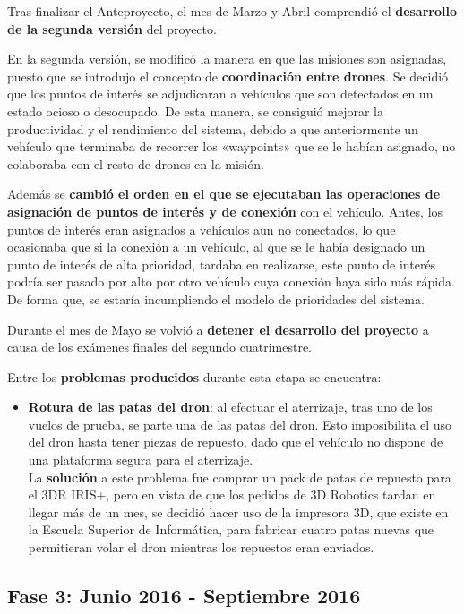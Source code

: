 Tras finalizar el Anteproyecto, el mes de Marzo y Abril comprendió el \textbf{desarrollo de la segunda versión} del proyecto.

En la segunda versión, se modificó la manera en que las misiones son asignadas, puesto que se introdujo el concepto de \textbf{coordinación entre drones}. Se decidió que los puntos de interés se adjudicaran a vehículos que son detectados en un estado ocioso o desocupado. De esta manera, se consiguió mejorar la productividad y el rendimiento del sistema, debido a que anteriormente un vehículo que terminaba de recorrer los «waypoints» que se le habían asignado, no colaboraba con el resto de drones en la misión. 

Además se \textbf{cambió el orden en el que se ejecutaban las operaciones de asignación de puntos de interés y de conexión} con el vehículo. Antes, los puntos de interés eran asignados a vehículos aun no conectados, lo que ocasionaba que si la conexión a un vehículo, al que se le había designado un punto de interés de alta prioridad, tardaba en realizarse, este punto de interés podría ser pasado por alto por otro vehículo cuya conexión haya sido más rápida. De forma que, se estaría incumpliendo el modelo de prioridades del sistema.

Durante el mes de Mayo se volvió a \textbf{detener el desarrollo del proyecto} a causa de los exámenes finales del segundo cuatrimestre.

Entre los \textbf{problemas producidos} durante esta etapa se encuentra:
\begin{itemize}
\item \textbf{Rotura de las patas del dron}: al efectuar el aterrizaje, tras uno de los vuelos de prueba, se parte una de las patas del dron. Esto imposibilita el uso del dron hasta tener piezas de repuesto, dado que el vehículo no dispone de una plataforma segura para el aterrizaje. \\ La \textbf{solución} a este problema fue comprar un pack de patas de repuesto para el 3DR IRIS+, pero en vista de que los pedidos de 3D Robotics tardan en llegar más de un mes, se decidió hacer uso de la impresora 3D, que existe en la Escuela Superior de Informática, para fabricar cuatro patas nuevas que permitieran volar el dron mientras los repuestos eran enviados. 
\end{itemize}

\subsection{Fase 3: Junio 2016 - Septiembre 2016}
\label{sec:cuartaetapa}

